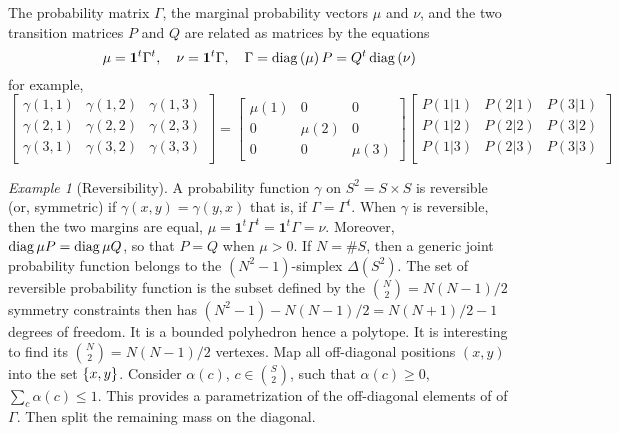 \documentclass[12pt,a4paper]{amsart}
\newcommand{\one}{\bm 1}
\theoremstyle{plain}%
\theoremstyle{definition}
\theoremstyle{remark}
\newtheorem{example}{Example}
\begin{document}
The probability matrix $\Gamma$, the marginal probability vectors $\mu$ and $\nu$, and the two transition matrices $P$ and $Q$ are related as matrices by the equations
\begin{equation*}
  \mu = \one^t \Gamma^t, \quad \nu = \one^t \Gamma, \quad \Gamma = \diagof \mu P = Q^t \diagof \nu 
\end{equation*}
for example,
\begin{equation*}
\begin{bmatrix}
    \gamma(1,1)  & \gamma(1,2) & \gamma(1,3) \\
    \gamma(2,1)  & \gamma(2,2) & \gamma(2,3) \\
    \gamma(3,1)  & \gamma(3,2) & \gamma(3,3) \\
  \end{bmatrix}
  =
  \begin{bmatrix}
 \mu(1) & 0 & 0 \\
  0 & \mu(2) & 0\\
  0 & 0 & \mu(3)     
  \end{bmatrix}
  \begin{bmatrix}
    P(1|1) &   P(2|1) &   P(3|1) \\
    P(1|2) &   P(2|2) &   P(3|2) \\
    P(1|3) &   P(2|3) &   P(3|3) \\
  \end{bmatrix}
\end{equation*}

\begin{example}[Reversibility]
  A probability function $\gamma$ on $S^2 = S \times S$ is reversible (or, symmetric) if $\gamma(x,y) = \gamma(y,x)$ that is, if $\Gamma = \Gamma^t$. When $\gamma$ is reversible, then the two margins are equal, $\mu = \one^t \Gamma^t = \one^t \Gamma = \nu$. Moreover, $\operatorname{diag} \mu P = \operatorname{diag} \mu Q$, so that $P=Q$ when $\mu > 0$. If $N = \# S$, then a generic joint probability function belongs to the $(N^2-1)$-simplex $\Delta(S^2)$. The set of reversible probability function is the subset defined by the $\binom N 2 = N(N-1)/2$ symmetry constraints then has $(N^2-1) - N(N-1)/2 = N(N+1)/2-1$ degrees of freedom. It is a bounded polyhedron hence a polytope. It is interesting to find its $\binom {N} 2 = N(N-1)/2$ vertexes. Map all off-diagonal positions $(x,y)$ into the set $\left\{x,y\right\}$. Consider $\alpha(c)$, $c \in \binom S 2$, such that $\alpha(c) \geq 0$, $\sum_c \alpha(c) \leq 1$. This provides a parametrization of the off-diagonal elements of of $\Gamma$. Then split the remaining mass on the diagonal.      
\end{example}
\end{document}
